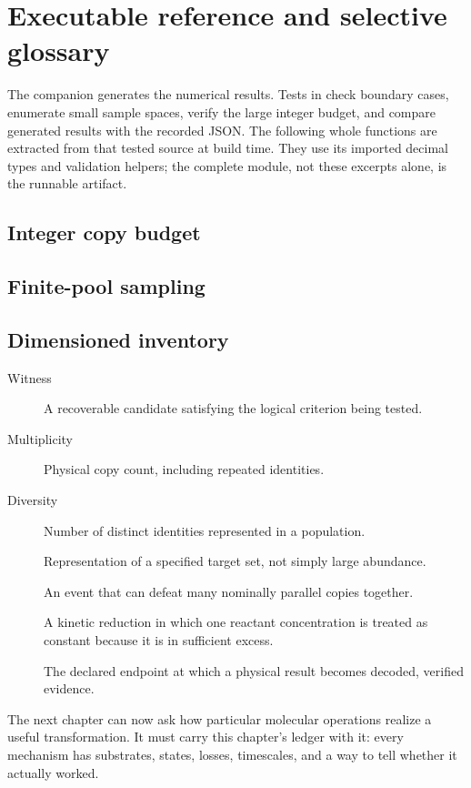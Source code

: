 \section{Executable reference and selective glossary}

The companion  generates the numerical results. Tests in  check boundary cases, enumerate small sample spaces, verify the large integer budget, and compare generated results with the recorded JSON. The following whole functions are extracted from that tested source at build time. They use its imported decimal types and validation helpers; the complete module, not these excerpts alone, is the runnable artifact.

\subsection{Integer copy budget}
\subsection{Finite-pool sampling}
\subsection{Dimensioned inventory}

\begin{description}
\item[Witness] A recoverable candidate satisfying the logical criterion being tested.
\item[Multiplicity] Physical copy count, including repeated identities.
\item[Diversity] Number of distinct identities represented in a population.
\item[] Representation of a specified target set, not simply large abundance.
\item[] An event that can defeat many nominally parallel copies together.
\item[] A kinetic reduction in which one reactant concentration is treated as constant because it is in sufficient excess.
\item[] The declared endpoint at which a physical result becomes decoded, verified evidence.
\end{description}

The next chapter can now ask how particular molecular operations realize a useful transformation. It must carry this chapter's ledger with it: every mechanism has substrates, states, losses, timescales, and a way to tell whether it actually worked.
